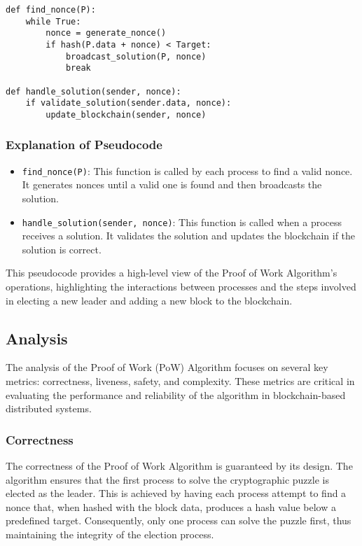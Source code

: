 \begin{verbatim}
def find_nonce(P):
    while True:
        nonce = generate_nonce()
        if hash(P.data + nonce) < Target:
            broadcast_solution(P, nonce)
            break

def handle_solution(sender, nonce):
    if validate_solution(sender.data, nonce):
        update_blockchain(sender, nonce)
\end{verbatim}

\subsubsection{Explanation of Pseudocode}

\begin{itemize}
    \item \texttt{find\_nonce(P)}: This function is called by each process to find a valid nonce. It generates nonces until a valid one is found and then broadcasts the solution.
    \item \texttt{handle\_solution(sender, nonce)}: This function is called when a process receives a solution. It validates the solution and updates the blockchain if the solution is correct.
\end{itemize}
This pseudocode provides a high-level view of the Proof of Work Algorithm's operations, highlighting the interactions between processes and the steps involved in electing a new leader and adding a new block to the blockchain.

\subsection{Analysis}
The analysis of the Proof of Work (PoW) Algorithm focuses on several key metrics: correctness, liveness, safety, and complexity. These metrics are critical in evaluating the performance and reliability of the algorithm in blockchain-based distributed systems.

\subsubsection{Correctness}

The correctness of the Proof of Work Algorithm is guaranteed by its design. The algorithm ensures that the first process to solve the cryptographic puzzle is elected as the leader. This is achieved by having each process attempt to find a nonce that, when hashed with the block data, produces a hash value below a predefined target. Consequently, only one process can solve the puzzle first, thus maintaining the integrity of the election process.


